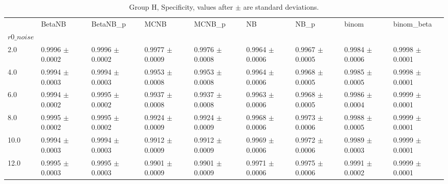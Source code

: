 \begin{table}[H]
\centering
\begin{adjustbox}{max width=\linewidth}
\begin{tabular}{lllllllll}
\toprule
 & BetaNB & BetaNB\_p & MCNB & MCNB\_p & NB & NB\_p & binom & binom\_beta \\
$r0\_noise$ &  &  &  &  &  &  &  &  \\
\midrule
2.0 & 0.9996 $\pm$ 0.0002 & 0.9996 $\pm$ 0.0002 & 0.9977 $\pm$ 0.0009 & 0.9976 $\pm$ 0.0008 & 0.9964 $\pm$ 0.0006 & 0.9967 $\pm$ 0.0005 & 0.9984 $\pm$ 0.0006 & 0.9998 $\pm$ 0.0001 \\
4.0 & 0.9994 $\pm$ 0.0003 & 0.9994 $\pm$ 0.0003 & 0.9953 $\pm$ 0.0008 & 0.9953 $\pm$ 0.0008 & 0.9964 $\pm$ 0.0006 & 0.9968 $\pm$ 0.0005 & 0.9985 $\pm$ 0.0005 & 0.9998 $\pm$ 0.0001 \\
6.0 & 0.9994 $\pm$ 0.0002 & 0.9995 $\pm$ 0.0002 & 0.9937 $\pm$ 0.0008 & 0.9937 $\pm$ 0.0008 & 0.9963 $\pm$ 0.0006 & 0.9968 $\pm$ 0.0005 & 0.9986 $\pm$ 0.0004 & 0.9999 $\pm$ 0.0001 \\
8.0 & 0.9995 $\pm$ 0.0002 & 0.9995 $\pm$ 0.0002 & 0.9924 $\pm$ 0.0009 & 0.9924 $\pm$ 0.0009 & 0.9968 $\pm$ 0.0006 & 0.9973 $\pm$ 0.0006 & 0.9988 $\pm$ 0.0005 & 0.9999 $\pm$ 0.0001 \\
10.0 & 0.9994 $\pm$ 0.0003 & 0.9994 $\pm$ 0.0003 & 0.9912 $\pm$ 0.0009 & 0.9912 $\pm$ 0.0009 & 0.9969 $\pm$ 0.0006 & 0.9972 $\pm$ 0.0006 & 0.9989 $\pm$ 0.0003 & 0.9999 $\pm$ 0.0001 \\
12.0 & 0.9995 $\pm$ 0.0003 & 0.9995 $\pm$ 0.0003 & 0.9901 $\pm$ 0.0009 & 0.9901 $\pm$ 0.0009 & 0.9971 $\pm$ 0.0006 & 0.9975 $\pm$ 0.0006 & 0.9991 $\pm$ 0.0002 & 0.9999 $\pm$ 0.0001 \\
\bottomrule
\end{tabular}

\end{adjustbox}
\caption{Group H, Specificity, values after $\pm$ are standard deviations.}
\end{table}
